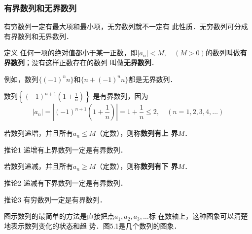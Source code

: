 \subsubsection{有界数列和无界数列}
有穷数列一定有最大项和最小项，无穷数列就不一定有
此性质．无穷数列可分成有界数列和无界数列．

\begin{blk}{定义}
任何一项的绝对值都小于某一正数，即$|a_n|<M,\quad (M>0)$的数列叫做\textbf{有界数列}；没有这样正数存在的数列
叫做\textbf{无界数列}．    
\end{blk}
 
例如，数列$\{(-1)^n n\}$和$\{n+(-1)^n n\}$都是无界数列．

数列$\left\{(-1)^{n+1}\left(1+\frac{1}{n}\right)\right\}$
是有界数列，因为
\[|a_n|=\left|(-1)^{n+1}\left(1+\frac{1}{n}\right)\right|=1+\frac{1}{n}\le 2,\quad (n=1,
2,3,4,\ldots)\]

若数列递增，并且所有$a_n\le M$（定数），则称\textbf{数列有上
界}$M$．

\begin{blk}{推论1}
    递增有上界数列一定是有界数列．
\end{blk}

 若数列递减，并且所有$a_n\ge M$（定数），则称\textbf{数列有下
界}$M$．

\begin{blk}{推论2 }
    递减有下界数列一定是有界数列．
\end{blk}

\begin{blk}{推论3}
    有穷数列一定是有界数列．
\end{blk}

图示数列的最简单的方法是直接把点$a_1,a_2,a_3,\ldots$标
在数轴上，这种图象可以清楚地表示数列变化的状态和趋
势．图5.1是几个数列的图象．

